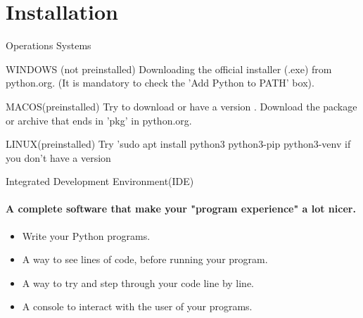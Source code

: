 \documentclass[aspectratio=169,19pt,english]{beamer}
\begin{document}
	\section{Installation}
	{\Large
		\begin{frame}{Operations Systems}
			
			\begin{block}{WINDOWS (not preinstalled)}
				Downloading the official installer (.exe) from python.org. (It is mandatory to check the 'Add Python to PATH' box).
				
			
				
			\end{block}
			\begin{exampleblock}{MACOS(preinstalled)}
				Try to download or have a version . 
				Download the package or archive that ends in 'pkg' in python.org.
				
				
				
			\end{exampleblock}
			
			
		\end{frame}
		
		\begin{frame}
				\begin{block}{LINUX(preinstalled)}
				Try 'sudo apt install python3 python3-pip python3-venv if you don't have a version 
				
				
			\end{block}
		\end{frame}
		
		\begin{frame}{Integrated Development Environment(IDE)}
			\framesubtitle{A complete software that make your "program experience" a lot nicer.}
			\begin{itemize}[label=$\circ$]
				\item Write your Python programs.
				\item A way to see lines of code, before running your program.
				\item A way to try and step through your code line by line.
				\item A console to interact with the user of your programs. 
			\end{itemize}
			

\end{frame}}
\end{document}
